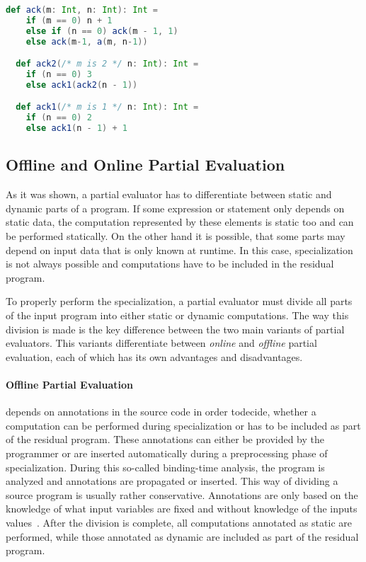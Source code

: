 \begin{lstlisting}[language=scala,caption={Definition of the \texttt{ackermann} function and its specialization.},label={lst:pps}]
  def ack(m: Int, n: Int): Int =
    if (m == 0) n + 1
    else if (n == 0) ack(m - 1, 1)
    else ack(m-1, a(m, n-1))

  def ack2(/* m is 2 */ n: Int): Int =
    if (n == 0) 3
    else ack1(ack2(n - 1))

  def ack1(/* m is 1 */ n: Int): Int =
    if (n == 0) 2
    else ack1(n - 1) + 1
\end{lstlisting}



\subsection{Offline and Online Partial Evaluation}\label{sec:offline-vs-online}

As it was shown, a partial evaluator has to differentiate between static and dynamic parts of a program.
If some expression or statement only depends on static data, the computation represented by these elements is static too and can be performed statically.
On the other hand it is possible, that some parts may depend on input data that is only known at runtime.
In this case, specialization is not always possible and computations have to be included in the residual program.

To properly perform the specialization, a partial evaluator must divide all parts of the input program into either static or dynamic computations.
The way this division is made is the key difference between the two main variants of partial evaluators.
This variants differentiate between \textit{online} and \textit{offline} partial evaluation, each of which has its own advantages and disadvantages.

\paragraph{Offline Partial Evaluation}
depends on annotations in the source code in order to\linebreak decide, whether a computation can be performed during specialization or has to be included as part of the residual program.
These annotations can either be provided by the programmer or are inserted automatically during a preprocessing phase of specialization.
During this so-called binding-time analysis, the program is analyzed and annotations are propagated or inserted.
This way of dividing a source program is usually rather conservative.
Annotations are only based on the knowledge of what input variables are fixed and without knowledge of the inputs values~\cite[Chap. 7]{Jones_PartialEvaluation}.
After the division is complete, all computations annotated as static are performed, while those annotated as dynamic are included as part of the residual program.


